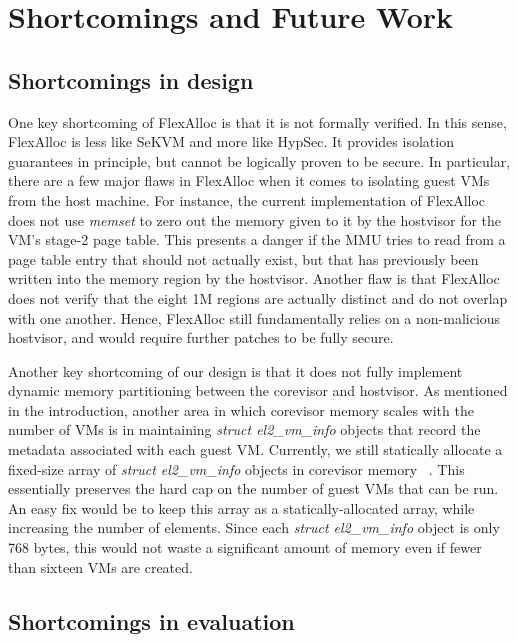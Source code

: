 \section{Shortcomings and Future Work}

\subsection{Shortcomings in design}

One key shortcoming of FlexAlloc is that it is not formally verified. In
this sense, FlexAlloc is less like SeKVM and more like HypSec. It provides isolation guarantees
in principle, but cannot be logically proven to be secure. In particular, there
are a few major flaws in FlexAlloc when it comes to isolating guest VMs from
the host machine. For instance, the current implementation of FlexAlloc
does not use \textit{memset} to zero out the memory given to it by the hostvisor
for the VM's stage-2 page table. This presents a danger if the MMU tries to
read from a page table entry that should not actually exist, but that has
previously been written into the memory region by the hostvisor. Another flaw is that
FlexAlloc does not verify that the eight 1M regions are actually distinct and
do not overlap with one another. Hence, FlexAlloc still fundamentally relies on
a non-malicious hostvisor, and would require further patches to be fully secure.

Another key shortcoming of our design is that it does not fully implement
dynamic memory partitioning between the corevisor and hostvisor. As mentioned in
the introduction, another area in which corevisor memory scales with the number
of VMs is in maintaining \textit{struct el2\_vm\_info} objects that record the
metadata associated with each guest VM. Currently, we still statically allocate
a fixed-size array of \textit{struct el2\_vm\_info} objects in corevisor
memory ~\cite{hypsec_host.h}. This essentially preserves the hard cap on the
number of guest VMs that can be run. An easy fix would be to keep this array
as a statically-allocated array, while increasing the number of elements. Since each
\textit{struct el2\_vm\_info} object is only 768 bytes, this would not waste a
significant amount of memory even if fewer than sixteen VMs are created.

\subsection{Shortcomings in evaluation}

